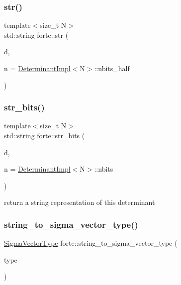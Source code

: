 \subsubsection{\texorpdfstring{str()}{str()}}
{\footnotesize\ttfamily template$<$size\+\_\+t N$>$ \\
std\+::string forte\+::str (\begin{DoxyParamCaption}\item[{const \mbox{\hyperlink{classforte_1_1_determinant_impl}{Determinant\+Impl}}$<$ N $>$ \&}]{d,  }\item[{int}]{n = {\ttfamily \mbox{\hyperlink{classforte_1_1_determinant_impl}{Determinant\+Impl}}$<$N$>$\+:\+:nbits\+\_\+half} }\end{DoxyParamCaption})}

\mbox{\label{namespaceforte_ae9cb3efd440a869cfceb01181e4afd29}} 
\subsubsection{\texorpdfstring{str\+\_\+bits()}{str\_bits()}}
{\footnotesize\ttfamily template$<$size\+\_\+t N$>$ \\
std\+::string forte\+::str\+\_\+bits (\begin{DoxyParamCaption}\item[{const \mbox{\hyperlink{classforte_1_1_determinant_impl}{Determinant\+Impl}}$<$ N $>$ \&}]{d,  }\item[{int}]{n = {\ttfamily \mbox{\hyperlink{classforte_1_1_determinant_impl}{Determinant\+Impl}}$<$N$>$\+:\+:nbits} }\end{DoxyParamCaption})}



return a string representation of this determinant 

\mbox{\label{namespaceforte_a145dfdfd035e7c51734442e2c5ee85ff}} 
\subsubsection{\texorpdfstring{string\+\_\+to\+\_\+sigma\+\_\+vector\+\_\+type()}{string\_to\_sigma\_vector\_type()}}
{\footnotesize\ttfamily \mbox{\hyperlink{namespaceforte_a94410e08f0cf9a0cfc5e53c70b6bf485}{Sigma\+Vector\+Type}} forte\+::string\+\_\+to\+\_\+sigma\+\_\+vector\+\_\+type (\begin{DoxyParamCaption}\item[{std\+::string}]{type }\end{DoxyParamCaption})}

